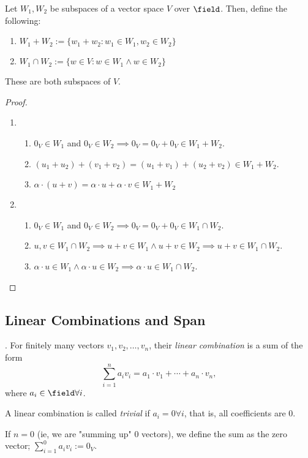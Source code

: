 \begin{proposition}
    Let $W_1, W_2$ be subspaces of a vector space $V$ over $\field$. Then, define the following:
    \begin{enumerate}
        \item $W_1 + W_2 := \{w_1 + w_2 : w_1 \in W_1, w_2 \in W_2\}$
        \item $W_1 \cap W_2:= \{w \in V : w \in W_1 \wedge w \in W_2\}$
    \end{enumerate}
    These are both subspaces of $V$.
\end{proposition}

\begin{proof}
    \begin{enumerate}
        \item \begin{enumerate}
            \item $0_V \in W_1$ and $0_V \in W_2 \implies 0_V = 0_V + 0_V \in W_1 + W_2$.
            \item $(u_1 +u_2) + (v_1 + v_2) = (u_1 + v_1) + (u_2 + v_2) \in W_1 + W_2$.
            \item $\alpha \cdot (u + v) = \alpha \cdot u + \alpha \cdot v \in W_1 + W_2$
        \end{enumerate}
        \item \begin{enumerate}
            \item $0_V \in W_1$ and $0_V \in W_2 \implies 0_V = 0_V + 0_V \in W_1 \cap W_2$.
            \item $u, v \in W_1 \cap W_2 \implies u + v \in W_1 \wedge u+v \in W_2 \implies u + v \in W_1 \cap W_2$.
            \item $\alpha \cdot u \in W_1 \wedge \alpha \cdot u \in W_2 \implies \alpha \cdot u \in W_1 \cap W_2$.
        \end{enumerate}
    \end{enumerate}
\end{proof}

\subsection{Linear Combinations and Span}

\begin{definition}
     . For finitely many vectors $v_1, v_2, \dots, v_n$, their \emph{linear combination} is a sum of the form \[
    \sum_{i=1}^{n} a_i v_i =  a_1 \cdot v_1 + \cdots + a_n \cdot v_n,
    \]
    where $a_i \in \field \forall i$.

    A linear combination is called \emph{trivial} if $a_i = 0 \forall i$, that is, all coefficients are $0$.

    If $n = 0$ (ie, we are "summing up" 0 vectors), we define the sum as the zero vector; $\sum_{i=1}^{0} a_i v_i := 0_V$.
\end{definition}